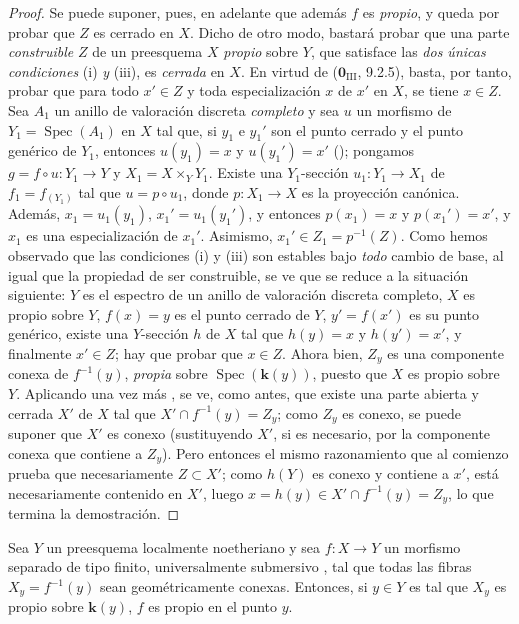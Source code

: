 \begin{proof}
Se puede suponer, pues, en adelante que además $f$ es \emph{propio}, y queda por probar que $Z$ es cerrado en $X$.
Dicho de otro modo, bastará probar que una parte \emph{construible} $Z$ de un preesquema $X$ \emph{propio} sobre $Y$, que satisface las \emph{dos únicas condiciones} (i) \emph{y} (iii), es \emph{cerrada} en $X$.
En virtud de ($\mathbf{0}_{\mathrm{III}}$, 9.2.5), basta, por tanto, probar que para todo $x'\in Z$ y toda especialización $x$ de $x'$ en $X$, se tiene $x\in Z$.
Sea $A_1$ un anillo de valoración discreta \emph{completo} y sea $u$ un morfismo de $Y_1=\operatorname{Spec}(A_1)$ en $X$ tal que, si $y_1$ e $y_1'$ son el punto cerrado y el punto genérico de $Y_1$, entonces $u(y_1)=x$ y $u(y_1')=x'$ (); pongamos $g=f\circ u:Y_1\to Y$ y $X_1=X\times_Y Y_1$. Existe una $Y_1$-sección $u_1:Y_1\to X_1$ de $f_1=f_{(Y_1)}$ tal que $u=p\circ u_1$, donde $p:X_1\to X$ es la proyección canónica.
Además, $x_1=u_1(y_1)$, $x_1'=u_1(y_1')$, y entonces $p(x_1)=x$ y $p(x_1')=x'$, y $x_1$ es una especialización de $x_1'$.
Asimismo, $x_1'\in Z_1=p^{-1}(Z)$. Como hemos observado que las condiciones (i) y (iii) son estables bajo \emph{todo} cambio de base, al igual que la propiedad de ser construible, se ve que se reduce a la situación siguiente: $Y$ es el espectro de un anillo de valoración discreta completo, $X$ es propio sobre $Y$, $f(x)=y$ es el punto cerrado de $Y$, $y'=f(x')$ es su punto genérico, existe una $Y$-sección $h$ de $X$ tal que $h(y)=x$ y $h(y')=x'$, y finalmente $x'\in Z$; hay que probar que $x\in Z$.
Ahora bien, $Z_y$ es una componente conexa de $f^{-1}(y)$, \emph{propia} sobre $\operatorname{Spec}(\boldsymbol{k}(y))$, puesto que $X$ es propio sobre $Y$.
Aplicando una vez más , se ve, como antes, que existe una parte abierta y cerrada $X'$ de $X$ tal que $X'\cap f^{-1}(y)=Z_y$; como $Z_y$ es conexo,
se puede suponer que $X'$ es conexo (sustituyendo $X'$, si es necesario, por la componente conexa que contiene a $Z_y$).
Pero entonces el mismo razonamiento que al comienzo prueba que necesariamente $Z\subset X'$; como $h(Y)$ es conexo y contiene a $x'$, está necesariamente contenido en $X'$, luego $x=h(y)\in X'\cap f^{-1}(y)=Z_y$, lo que termina la demostración.
\end{proof}

\begin{corollary}[15.7.10]
\label{IV.15.7.10}
Sea $Y$ un preesquema localmente noetheriano y sea $f:X\to Y$ un morfismo separado de tipo finito, universalmente submersivo , tal que todas las fibras $X_y=f^{-1}(y)$ sean geométricamente conexas.
Entonces, si $y\in Y$ es tal que $X_y$ es propio sobre $\boldsymbol{k}(y)$, $f$ es propio en el punto $y$.
\end{corollary}

